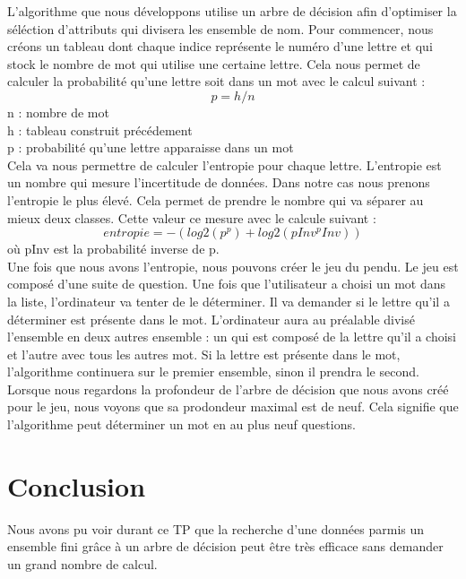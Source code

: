 \documentclass[a4paper,11pt]{article}
\begin{document}
  L'algorithme que nous développons utilise un arbre de décision afin d'optimiser la séléction d'attributs qui
  divisera les ensemble de nom. Pour commencer, nous créons un tableau dont chaque indice représente le numéro
  d'une lettre et qui stock le nombre de mot qui utilise une certaine lettre. Cela nous permet de calculer
  la probabilité qu'une lettre soit dans un mot avec le calcul suivant :
  $$ p = h / n $$
  n : nombre de mot\\
  h : tableau construit précédement\\
  p : probabilité qu'une lettre apparaisse dans un mot\\
  
  Cela va nous permettre de calculer l'entropie pour chaque lettre. L'entropie est un nombre qui mesure
  l'incertitude de données. Dans notre cas nous prenons l'entropie le plus élevé. Cela permet de prendre
  le nombre qui va séparer au mieux deux classes. Cette valeur ce mesure avec le calcule suivant :
  $$entropie = -(log2(p ^ p) + log2(pInv ^ pInv))$$
  où pInv est la probabilité inverse de p.\\
  
  Une fois que nous avons l'entropie, nous pouvons créer le jeu du pendu. Le jeu est composé d'une suite de question.
  Une fois que l'utilisateur a choisi un mot dans la liste, l'ordinateur va tenter de le déterminer. Il va demander
  si le lettre qu'il a déterminer est présente dans le mot. L'ordinateur aura au préalable divisé l'ensemble en 
  deux autres ensemble : un qui est composé de la lettre qu'il a choisi et l'autre avec tous les autres mot. 
  Si la lettre est présente dans le mot, l'algorithme continuera sur le premier ensemble, sinon il prendra le second.\\
  
  Lorsque nous regardons la profondeur de l'arbre de décision que nous avons créé pour le jeu, nous voyons que 
  sa prodondeur maximal est de neuf. Cela signifie que l'algorithme peut déterminer un mot en au plus neuf
  questions.
  
  \section{Conclusion}
  Nous avons pu voir durant ce TP que la recherche d'une données parmis un ensemble fini grâce à un arbre de 
  décision peut être très efficace sans demander un grand nombre de calcul.
  
\end{document}

